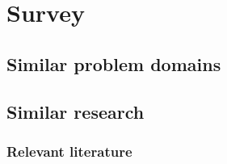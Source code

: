 \chapter{Survey}

\label{Chapter2}


\section{Similar problem domains} %
\label{sec:similar_problem_domains}


\section{Similar research} %
\label{sec:similar_applications}

\subsection{Relevant literature} %
\label{sub:relevant_literature}






